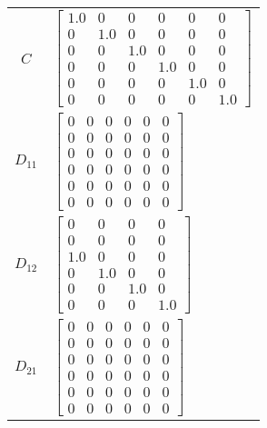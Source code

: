 \begin{tabular}{cl}
   $C$    & $\left[\begin{matrix}1.0 & 0 & 0 & 0 & 0 & 0\\0 & 1.0 & 0 & 0 & 0 & 0\\0 & 0 & 1.0 & 0 & 0 & 0\\0 & 0 & 0 & 1.0 & 0 & 0\\0 & 0 & 0 & 0 & 1.0 & 0\\0 & 0 & 0 & 0 & 0 & 1.0\end{matrix}\right]$                                          \\
 $D_{11}$ & $\left[\begin{matrix}0 & 0 & 0 & 0 & 0 & 0\\0 & 0 & 0 & 0 & 0 & 0\\0 & 0 & 0 & 0 & 0 & 0\\0 & 0 & 0 & 0 & 0 & 0\\0 & 0 & 0 & 0 & 0 & 0\\0 & 0 & 0 & 0 & 0 & 0\end{matrix}\right]$                                                      \\
 $D_{12}$ & $\left[\begin{matrix}0 & 0 & 0 & 0\\0 & 0 & 0 & 0\\1.0 & 0 & 0 & 0\\0 & 1.0 & 0 & 0\\0 & 0 & 1.0 & 0\\0 & 0 & 0 & 1.0\end{matrix}\right]$                                                                                              \\
 $D_{21}$ & $\left[\begin{matrix}0 & 0 & 0 & 0 & 0 & 0\\0 & 0 & 0 & 0 & 0 & 0\\0 & 0 & 0 & 0 & 0 & 0\\0 & 0 & 0 & 0 & 0 & 0\\0 & 0 & 0 & 0 & 0 & 0\\0 & 0 & 0 & 0 & 0 & 0\end{matrix}\right]$                                                      \\
\hline
\end{tabular}